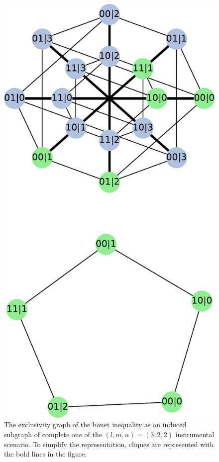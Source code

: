 \documentclass[letterpaper]{article}
\begin{document}
\begin{figure}[t]
    \centering
    \includegraphics[width=.6\columnwidth]{images/instrumental_c5.pdf}
    \caption{The exclusivity graph of the bonet inequality as an induced
    subgraph of complete one of the $(l,m,n)=(3,2,2)$ instrumental
    scenario. To simplify the representation, cliques are represented
    with the bold lines in the figure.}
    \label{fig:bonetexc}
\end{figure}
\end{document}
